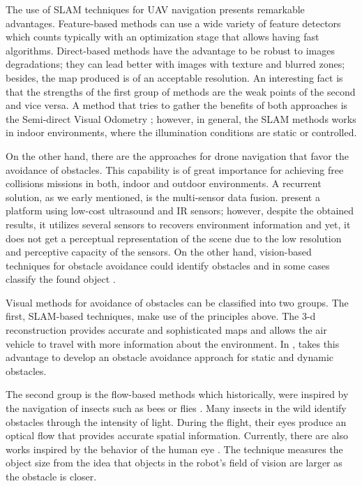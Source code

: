 The use of SLAM techniques for UAV navigation presents remarkable advantages. Feature-based methods can use a wide variety of feature detectors which counts typically with an optimization stage that allows having fast algorithms. Direct-based methods have the advantage to be robust to images degradations; they can lead better with images with texture and blurred zones; besides, the map produced is of an acceptable resolution. An interesting fact is that the strengths of the first group of methods are the weak points of the second and vice versa. A method that tries to gather the benefits of both approaches is the Semi-direct Visual Odometry \citep{Forster.Pizzoli.ea:ICRA:2014}; however, in general, the SLAM methods works in indoor environments, where the illumination conditions are static or controlled.

On the other hand, there are the approaches for drone navigation that favor the avoidance of obstacles. This capability is of great importance for achieving free collisions missions in both, indoor and outdoor environments. A recurrent solution, as we early mentioned, is the multi-sensor data fusion. \cite{Gageik.Benz.ea:ACCESS:2015} present a platform using low-cost ultrasound and IR sensors; however, despite the obtained results, it utilizes several sensors to recovers environment information and yet, it does not get a perceptual representation of the scene due to the low resolution and perceptive capacity of the sensors. On the other hand, vision-based techniques for obstacle avoidance could identify obstacles and in some cases classify the found object \citep{Li.Ye.ea:IROS:2016}. 

Visual methods for avoidance of obstacles can be classified into two groups. The first, SLAM-based techniques, make use of the principles above. The 3-d reconstruction provides accurate and sophisticated maps and allows the air vehicle to travel with more information about the environment. In \citep{Moreno-Armendariz.Calvo:ICMEAE:2014}, takes this advantage to develop an obstacle avoidance approach for static and dynamic obstacles. 

The second group is the flow-based methods which historically, were inspired by the navigation of insects such as bees \citep{Srinivasan.Gregory:PTBS:1992} or flies \citep{Franceschini.Ruffier.ea:InTech:2009}. Many insects in the wild identify obstacles through the intensity of light. During the flight, their eyes produce an optical flow that provides accurate spatial information. Currently, there are also works inspired by the behavior of the human eye \citep{Al-Kaff.Meng.ea:IVS:2016}. The technique measures the object size from the idea that objects in the robot's field of vision are larger as the obstacle is closer.

